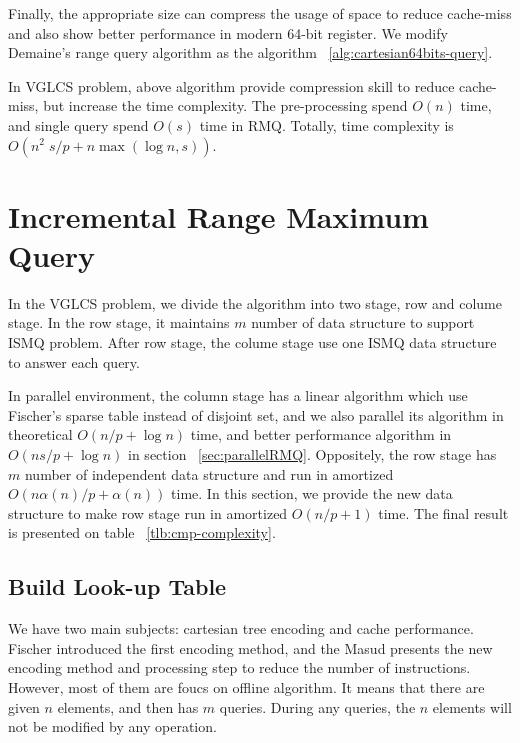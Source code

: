 Finally, the appropriate size can compress the usage of space to
reduce cache-miss and also show better performance in modern 64-bit
register.  We modify Demaine's range query algorithm as the algorithm
~\ref{alg:cartesian64bits-query}.





In VGLCS problem, above algorithm provide compression skill to reduce
cache-miss, but increase the time complexity.  The pre-processing
spend $O(n)$ time, and single query spend $O(s)$ time in RMQ.
Totally, time complexity is $O(n^2 \; s / p + n \max(\log n, s))$.


\section{Incremental Range Maximum Query}

In the VGLCS problem, we divide the algorithm into two stage, row and
colume stage.  In the row stage, it maintains $m$ number of data
structure to support ISMQ problem.  After row stage, the colume stage
use one ISMQ data structure to answer each query.

In parallel environment, the column stage has a linear algorithm which
use Fischer's sparse table instead of disjoint set, and we also
parallel its algorithm in theoretical $O(n / p + \log n)$ time, and
better performance algorithm in $O(n s / p + \log n)$ in section
~\ref{sec:parallelRMQ}.  Oppositely, the row stage has $m$ number of
independent data structure and run in amortized $O(n \alpha(n) / p +
\alpha(n))$ time.  In this section, we provide the new data structure
to make row stage run in amortized $O(n / p + 1)$ time.  The final
result is presented on table ~\ref{tlb:cmp-complexity}.



\subsection{Build Look-up Table}

We have two main subjects: cartesian tree encoding and cache
performance.  Fischer introduced the first encoding method, and the
Masud presents the new encoding method and processing step to reduce
the number of instructions.  However, most of them are foucs on
offline algorithm.  It means that there are given $n$ elements, and
then has $m$ queries.  During any queries, the $n$ elements will not
be modified by any operation.

